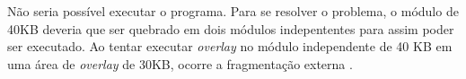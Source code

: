 
Não seria possível executar o programa. Para se resolver o problema, o módulo
de 40KB deveria que ser quebrado em dois módulos indepententes para assim poder 
ser executado.  Ao tentar executar \textsl{overlay} no módulo independente de
40 KB em uma área de \textsl{overlay} de 30KB, ocorre a fragmentação 
externa \cite{ContiguousTechniques}.

